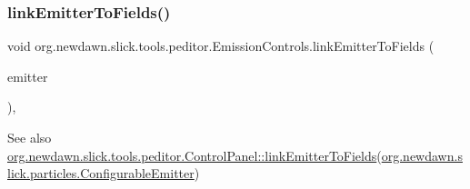 \subsubsection{\texorpdfstring{link\+Emitter\+To\+Fields()}{linkEmitterToFields()}}
{\footnotesize\ttfamily void org.\+newdawn.\+slick.\+tools.\+peditor.\+Emission\+Controls.\+link\+Emitter\+To\+Fields (\begin{DoxyParamCaption}\item[{\mbox{\hyperlink{classorg_1_1newdawn_1_1slick_1_1particles_1_1_configurable_emitter}{Configurable\+Emitter}}}]{emitter }\end{DoxyParamCaption})\hspace{0.3cm}{\ttfamily [inline]}, {\ttfamily [protected]}}

\begin{DoxySeeAlso}{See also}
\mbox{\hyperlink{classorg_1_1newdawn_1_1slick_1_1tools_1_1peditor_1_1_control_panel_a55fa468548caadc265ea28c5f3214a20}{org.\+newdawn.\+slick.\+tools.\+peditor.\+Control\+Panel\+::link\+Emitter\+To\+Fields}}(\mbox{\hyperlink{classorg_1_1newdawn_1_1slick_1_1particles_1_1_configurable_emitter}{org.\+newdawn.\+slick.\+particles.\+Configurable\+Emitter}}) 
\end{DoxySeeAlso}

